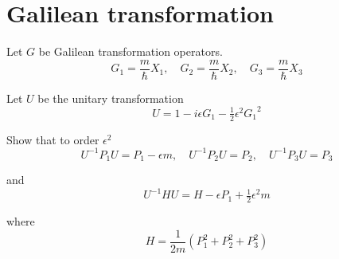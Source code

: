

\section*{Galilean transformation}

Let $G$ be Galilean transformation operators.
\begin{equation*}
G_1=\frac{m}{\hbar}X_1,\quad G_2=\frac{m}{\hbar}X_2,\quad G_3=\frac{m}{\hbar}X_3
\end{equation*}

Let $U$ be the unitary transformation
\begin{equation*}
U=1-i\epsilon G_1-\tfrac{1}{2}\epsilon^2{G_1}^2
\end{equation*}

Show that to order $\epsilon^2$
\begin{equation*}
U^{-1}P_1U=P_1-\epsilon m,\quad U^{-1}P_2U=P_2,\quad U^{-1}P_3U=P_3\tag{1}
\end{equation*}

and
\begin{equation*}
U^{-1}HU=H-\epsilon P_1+\tfrac{1}{2}\epsilon^2m\tag{2}
\end{equation*}

where
\begin{equation*}
H=\frac{1}{2m}\left(P_1^2+P_2^2+P_3^2\right)
\end{equation*}


